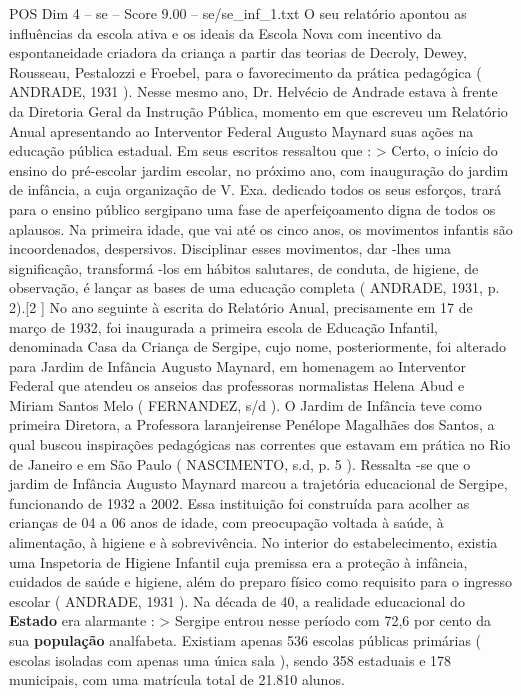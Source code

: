 \begin{textsample}{POS Dim 4 – se – Score 9.00 – se/se\_inf\_1.txt}
O seu relatório apontou as influências da escola ativa e os ideais da Escola Nova com incentivo da espontaneidade criadora da criança a partir das teorias de Decroly, Dewey, Rousseau, Pestalozzi e Froebel, para o favorecimento da prática pedagógica ( ANDRADE, 1931 ).
Nesse mesmo ano, Dr.
Helvécio de Andrade estava à frente da Diretoria Geral da Instrução Pública, momento em que escreveu um Relatório Anual apresentando ao Interventor Federal Augusto Maynard suas ações na educação pública estadual.
Em seus escritos ressaltou que : > Certo, o início do ensino do pré-escolar jardim escolar, no próximo ano, com inauguração do jardim de infância, a cuja organização de V.
Exa. dedicado todos os seus esforços, trará para o ensino público sergipano uma fase de aperfeiçoamento digna de todos os aplausos.
Na primeira idade, que vai até os cinco anos, os movimentos infantis são incoordenados, despersivos.
Disciplinar esses movimentos, dar -lhes uma significação, transformá -los em hábitos salutares, de conduta, de higiene, de observação, é lançar as bases de uma educação completa ( ANDRADE, 1931, p. 2).[2 ] No ano seguinte à escrita do Relatório Anual, precisamente em 17 de março de 1932, foi inaugurada a primeira escola de Educação Infantil, denominada Casa da Criança de Sergipe, cujo nome, posteriormente, foi alterado para Jardim de Infância Augusto Maynard, em homenagem ao Interventor Federal que atendeu os anseios das professoras normalistas Helena Abud e Miriam Santos Melo ( FERNANDEZ, s/d ).
O Jardim de Infância teve como primeira Diretora, a Professora laranjeirense Penélope Magalhães dos Santos, a qual buscou inspirações pedagógicas nas correntes que estavam em prática no Rio de Janeiro e em São Paulo ( NASCIMENTO, s.d, p. 5 ).
Ressalta -se que o jardim de Infância Augusto Maynard marcou a trajetória educacional de Sergipe, funcionando de 1932 a 2002.
Essa instituição foi construída para acolher as crianças de 04 a 06 anos de idade, com preocupação voltada à saúde, à alimentação, à higiene e à sobrevivência.
No interior do estabelecimento, existia uma Inspetoria de Higiene Infantil cuja premissa era a proteção à infância, cuidados de saúde e higiene, além do preparo físico como requisito para o ingresso escolar ( ANDRADE, 1931 ).
Na década de 40, a realidade educacional do \textbf{Estado} era alarmante : > Sergipe entrou nesse período com 72,6 por cento da sua \textbf{população} analfabeta.
Existiam apenas 536 escolas públicas primárias ( escolas isoladas com apenas uma única sala ), sendo 358 estaduais e 178 municipais, com uma matrícula total de 21.810 alunos.

\end{textsample}
